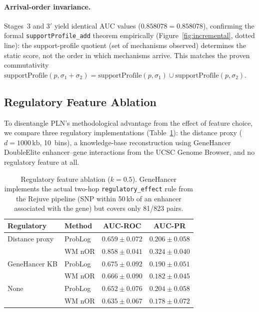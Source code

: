 \documentclass[]{article}
\newcommand{\code}[1]{\texttt{#1}}
\begin{document}
\paragraph{Arrival-order invariance.}
Stages~3 and 3$'$ yield identical AUC values ($0.858078 = 0.858078$),
confirming the formal \code{supportProfile\_add} theorem empirically
(Figure~\ref{fig:incremental}, dotted line):
the support-profile quotient (set of mechanisms observed) determines the
static score, not the order in which mechanisms arrive.
This matches the proven commutativity $\mathrm{supportProfile}(p, \sigma_1 + \sigma_2)
= \mathrm{supportProfile}(p, \sigma_1) \cup \mathrm{supportProfile}(p, \sigma_2)$.

\subsection{Regulatory Feature Ablation}
\label{sec:ablation}

To disentangle PLN's methodological advantage from the effect of feature choice,
we compare three regulatory implementations (Table~\ref{tab:ablation}):
the distance proxy ($d = 1000$\,kb, 10~bins), a knowledge-base reconstruction
using GeneHancer DoubleElite enhancer--gene interactions from the UCSC Genome
Browser, and no regulatory feature at all.

\begin{table}[t]
\centering
\caption{Regulatory feature ablation ($k = 0.5$).  GeneHancer implements the
  actual two-hop \code{regulatory\_effect} rule from the Rejuve pipeline
  (SNP within 50\,kb of an enhancer associated with the gene) but covers only
  81/823 pairs.}
\label{tab:ablation}
\begin{tabular}{@{}llcc@{}}
\toprule
\textbf{Regulatory} & \textbf{Method} & \textbf{AUC-ROC} & \textbf{AUC-PR} \\
\midrule
Distance proxy  & ProbLog & $0.659 \pm 0.072$ & $0.206 \pm 0.058$ \\
                & WM nOR  & $\mathbf{0.858 \pm 0.041}$ & $\mathbf{0.324 \pm 0.040}$ \\
\midrule
GeneHancer KB   & ProbLog & $0.675 \pm 0.092$ & $0.190 \pm 0.051$ \\
                & WM nOR  & $0.666 \pm 0.090$ & $0.182 \pm 0.045$ \\
\midrule
None            & ProbLog & $0.652 \pm 0.076$ & $0.204 \pm 0.058$ \\
                & WM nOR  & $0.635 \pm 0.067$ & $0.178 \pm 0.072$ \\
\bottomrule
\end{tabular}
\end{table}
\end{document}

